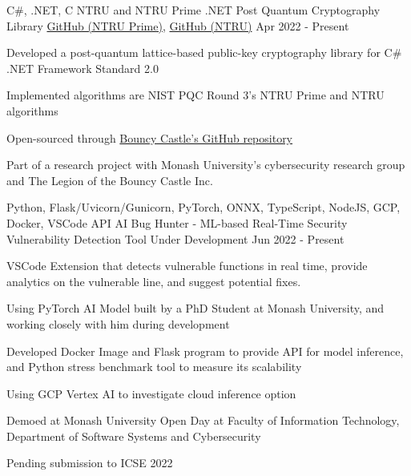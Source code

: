 




\begin{cventries}

  \cventry
  {C\#, .NET, C}
  {NTRU and NTRU Prime .NET Post Quantum Cryptography Library}
  {\href{https://github.com/bcgit/bc-csharp/tree/master/crypto/src/pqc/crypto/ntruprime}{GitHub (NTRU Prime)}, \href{https://github.com/bcgit/bc-csharp/tree/master/crypto/src/pqc/crypto/ntru}{GitHub (NTRU)}} %
  {Apr 2022 - Present}
  {
    \begin{cvitems}
      \item {Developed a post-quantum lattice-based public-key cryptography library for C\# .NET Framework Standard 2.0}
      \item {Implemented algorithms are NIST PQC Round 3's NTRU Prime and NTRU algorithms}
      \item {Open-sourced through \href{https://github.com/bcgit/bc-csharp}{Bouncy Castle's GitHub repository}}
      \item {Part of a research project with Monash University's cybersecurity research group and The Legion of the Bouncy Castle Inc.}
    \end{cvitems}
  }

  \cventry
  {Python, Flask/Uvicorn/Gunicorn, PyTorch, ONNX, TypeScript, NodeJS, GCP, Docker, VSCode API}
  {AI Bug Hunter - ML-based Real-Time Security Vulnerability Detection Tool}
  {Under Development} %
  {Jun 2022 - Present}
  {
    \begin{cvitems}
      \item {VSCode Extension that detects vulnerable functions in real time, provide analytics on the vulnerable line, and suggest potential fixes.}
      \item {Using PyTorch AI Model built by a PhD Student at Monash University, and working closely with him during development}
      \item {Developed Docker Image and Flask program to provide API for model inference, and Python stress benchmark tool to measure its scalability}
      \item {Using GCP Vertex AI to investigate cloud inference option}
      \item {Demoed at Monash University Open Day at Faculty of Information Technology, Department of Software Systems and Cybersecurity}
      \item {Pending submission to ICSE 2022}
    \end{cvitems}
  }


\end{cventries}
